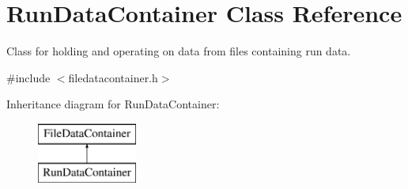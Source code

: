 \hypertarget{classRunDataContainer}{}\section{Run\+Data\+Container Class Reference}
\label{classRunDataContainer}


Class for holding and operating on data from files containing run data.  




{\ttfamily \#include $<$filedatacontainer.\+h$>$}

Inheritance diagram for Run\+Data\+Container\+:\begin{figure}[H]
\begin{center}
\leavevmode
\includegraphics[height=2.000000cm]{classRunDataContainer}
\end{center}
\end{figure}
